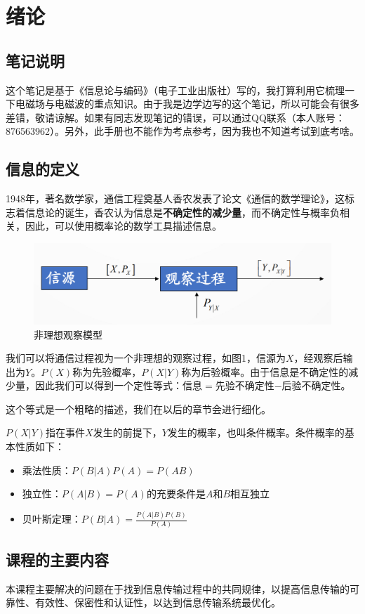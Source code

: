 \documentclass[UTF8,a4paper,11pt]{article}
\begin{document}
\setcounter{page}{1}
\section{绪论}
\subsection{笔记说明}
这个笔记是基于《信息论与编码》（电子工业出版社）写的，我打算利用它梳理一下电磁场与电磁波的重点知识。由于我是边学边写的这个笔记，所以可能会有很多差错，敬请谅解。如果有同志发现笔记的错误，可以通过QQ联系（本人账号：876563962）。另外，此手册也不能作为考点参考，因为我也不知道考试到底考啥。

\subsection{信息的定义}
1948年，著名数学家，通信工程奠基人香农发表了论文《通信的数学理论》，这标志着信息论的诞生，香农认为信息是\textbf{不确定性的减少量}，而不确定性与概率负相关，因此，可以使用概率论的数学工具描述信息。
\begin{figure}[htbp]
\centering
\includegraphics[scale=0.6]{p1.png}
\caption{非理想观察模型}
\end{figure}

我们可以将通信过程视为一个非理想的观察过程，如图1，信源为$X$，经观察后输出为$Y$。$P(X)$称为先验概率，$P(X|Y)$称为后验概率。由于信息是不确定性的减少量，因此我们可以得到一个定性等式：信息$=$先验不确定性$-$后验不确定性。

这个等式是一个粗略的描述，我们在以后的章节会进行细化。

$P(X|Y)$指在事件$X$发生的前提下，$Y$发生的概率，也叫条件概率。条件概率的基本性质如下：
\begin{itemize}
\item 乘法性质：$P(B|A)P(A)=P(AB)$
\item 独立性：$P(A|B)=P(A)$的充要条件是$A$和$B$相互独立
\item 贝叶斯定理：$P(B|A)=\frac{P(A|B)P(B)}{P(A)}$
\end{itemize}

\subsection{课程的主要内容}
本课程主要解决的问题在于找到信息传输过程中的共同规律，以提高信息传输的可靠性、有效性、保密性和认证性，以达到信息传输系统最优化。
\end{document}
